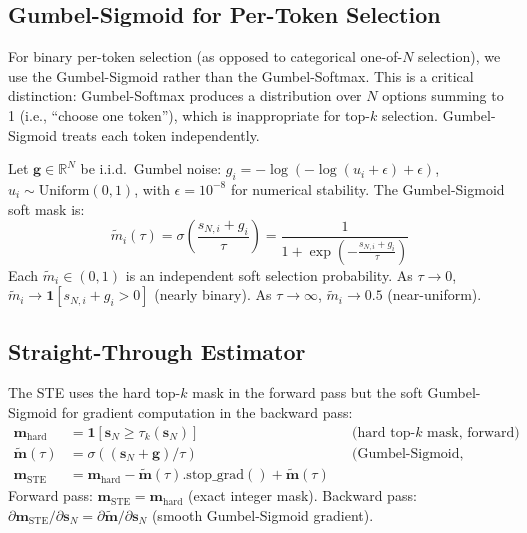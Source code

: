 \documentclass[12pt,a4paper]{article}
\newcommand{\R}{\mathbb{R}}
\newcommand{\vm}{\mathbf{m}}     %
\newcommand{\vs}{\mathbf{s}}     %
\begin{document}
\subsection{Gumbel-Sigmoid for Per-Token Selection}

For binary per-token selection (as opposed to categorical one-of-$N$ selection),
we use the Gumbel-Sigmoid rather than the Gumbel-Softmax. This is a critical
distinction: Gumbel-Softmax produces a distribution over $N$ options summing to
1 (i.e., ``choose one token''), which is inappropriate for top-$k$ selection.
Gumbel-Sigmoid treats each token independently.

\begin{mathbox}[title={Gumbel-Sigmoid for Independent Binary Selection}]
Let $\mathbf{g} \in \R^N$ be i.i.d.\ Gumbel noise:
$g_i = -\log(-\log(u_i + \epsilon) + \epsilon)$,  $u_i \sim \mathrm{Uniform}(0,1)$,
with $\epsilon = 10^{-8}$ for numerical stability. The Gumbel-Sigmoid soft mask is:
\begin{equation}
  \tilde{m}_i(\tau) = \sigma\!\left(\frac{s_{N,i} + g_i}{\tau}\right)
    = \frac{1}{1 + \exp\!\left(-\frac{s_{N,i} + g_i}{\tau}\right)}
  \label{eq:gumbel_sigmoid}
\end{equation}
Each $\tilde{m}_i \in (0,1)$ is an independent soft selection probability.
As $\tau \to 0$, $\tilde{m}_i \to \mathbf{1}[s_{N,i} + g_i > 0]$ (nearly binary).
As $\tau \to \infty$, $\tilde{m}_i \to 0.5$ (near-uniform).
\end{mathbox}

\subsection{Straight-Through Estimator}

\begin{mathbox}[title={Straight-Through Estimator (STE)}]
The STE uses the hard top-$k$ mask in the forward pass but the soft
Gumbel-Sigmoid for gradient computation in the backward pass:
\begin{align}
  \vm_{\mathrm{hard}} &= \mathbf{1}[\vs_N \geq \tau_k(\vs_N)]
    && \text{(hard top-}k\text{ mask, forward)} \label{eq:hard} \\
  \tilde{\vm}(\tau) &= \sigma((\vs_N + \mathbf{g}) / \tau)
    && \text{(Gumbel-Sigmoid, backward)} \label{eq:soft} \\
  \vm_{\mathrm{STE}} &= \vm_{\mathrm{hard}}
    - \tilde{\vm}(\tau).\mathrm{stop\_grad}() + \tilde{\vm}(\tau)
    \label{eq:ste}
\end{align}
Forward pass: $\vm_{\mathrm{STE}} = \vm_{\mathrm{hard}}$ (exact integer mask).
Backward pass: $\partial \vm_{\mathrm{STE}} / \partial \vs_N =
\partial \tilde{\vm} / \partial \vs_N$ (smooth Gumbel-Sigmoid gradient).
\end{mathbox}
\end{document}
